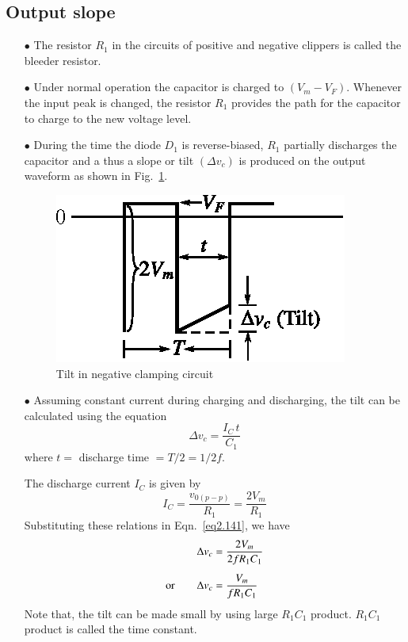 \subsection{Output slope}\label{sec2.34.3}
\begin{itemize}
\item[$\bullet$] The resistor $R_{1}$ in the circuits of positive and negative clippers is called the bleeder resistor.

\item[$\bullet$] Under normal operation the capacitor is charged to $(V_{m}-V_{F})$. Whenever the input peak is changed, the resistor $R_{1}$ provides the path for the capacitor to charge to the new voltage level.

\item[$\bullet$] During the time the diode $D_{1}$ is reverse-biased, $R_{1}$ partially discharges the capacitor and a thus a slope or tilt $(\Delta v_{c})$ is produced on the output waveform as shown in Fig.~\ref{fig2.41}.
\begin{figure}[H]
\centering
\includegraphics[scale=1.1]{chap2/fig2.41.eps}
\caption{Tilt in negative clamping circuit}\label{fig2.41}
\end{figure}

\item[$\bullet$] Assuming constant current during charging and discharging, the tilt can be calculated using the equation
\begin{equation}
\Delta v_{c}=\dfrac{I_{C}\,t}{C_{1}}\label{eq2.141}
\end{equation}
where $t=$ discharge time $=T/2=1/2f$.

The discharge current $I_{C}$ is given by
\begin{equation}
I_{C}=\dfrac{v_{0(p-p)}}{R_{1}}=\dfrac{2V_{m}}{R_{1}}\label{eq2.142}
\end{equation}
Substituting these relations in Eqn.~\eqref{eq2.141}, we have
\begin{align}
\Delta v_{c} &= \frac{2V_{m}}{2fR_{1}C_{1}}\notag\\[5pt]
\text{or}\qquad \Delta v_{c} &= \frac{V_{m}}{fR_{1}C_{1}}\label{eq2.143}
\end{align}
Note that, the tilt can be made small by using large $R_{1}C_{1}$ product. $R_{1}C_{1}$ product is called the time constant.
\end{itemize}

